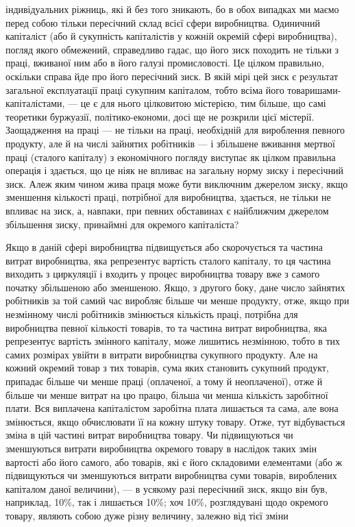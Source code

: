 \parcont{}  %
індивідуальних ріжниць, які й без того зникають, бо в обох
випадках ми маємо перед собою тільки пересічний склад всієї
сфери виробництва. Одиничний капіталіст (або й сукупність капіталістів у кожній окремій сфері
виробництва), погляд якого
обмежений, справедливо гадає, що його зиск походить не тільки
з праці, вживаної ним або в його галузі промисловості. Це цілком правильно, оскільки справа йде про
його пересічний зиск.
В якій мірі цей зиск є результат загальної експлуатації праці
сукупним капіталом, тобто всіма його товаришами-капіталістами, — це є для нього цілковитою
містерією, тим більше, що самі теоретики буржуазії, політико-економи, досі ще не розкрили цієї
містерії. Заощадження на праці — не тільки на праці, необхідній
для вироблення певного продукту, але й на числі зайнятих робітників — і збільшене вживання мертвої
праці (сталого капіталу)
з економічного погляду виступає як цілком правильна операція і здається, що це ніяк не впливає на
загальну норму
зиску і пересічний зиск. Алеж яким чином жива праця може
бути виключним джерелом зиску, якщо зменшення кількості
праці, потрібної для виробництва, здається, не тільки не впливає на зиск, а, навпаки, при певних
обставинах є найближчим
джерелом збільшення зиску, принаймні для окремого капіталіста?

Якщо в даній сфері виробництва підвищується або скорочується та частина витрат виробництва, яка
репрезентує вартість
сталого капіталу, то ця частина виходить з циркуляції і входить
у процес виробництва товару вже з самого початку збільшеною або зменшеною. Якщо, з другого боку,
дане число зайнятих робітників за той самий час виробляє більше чи менше продукту, отже, якщо при
незмінному числі робітників змінюється кількість праці, потрібна для виробництва певної кількості
товарів, то та частина витрат виробництва, яка репрезентує вартість змінного капіталу, може лишитись
незмінною,
тобто в тих самих розмірах увійти в витрати виробництва сукупного продукту. Але на кожний окремий
товар з тих товарів, сума яких становить сукупний продукт, припадає більше чи менше праці
(оплаченої, а тому й неоплаченої), отже й більше
чи менше витрат на цю працю, більша чи менша кількість заробітної плати. Вся виплачена капіталістом
заробітна плата лишається та сама, але вона змінюється, якщо обчислювати її на кожну штуку товару.
Отже, тут відбувається зміна в цій частині
витрат виробництва товару. Чи підвищуються чи зменшуються витрати виробництва окремого товару в
наслідок таких змін вартості
або його самого, або товарів, які є його складовими елементами
(або ж підвищуються чи зменшуються витрати виробництва суми
товарів, вироблених капіталом даної величини), — в усякому
разі пересічний зиск, якщо він був, наприклад, 10\%, так і лишається 10\%; хоч 10\%, розглядувані щодо
окремого товару,
являють собою дуже різну величину, залежно від тієї зміни
\parbreak{}  %
